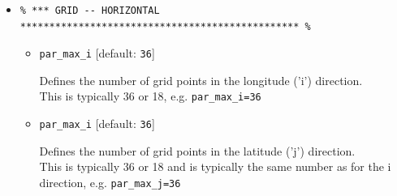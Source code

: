 \begin{itemize}
\begin{itemize}[noitemsep]
Specifies the sub-directory where the \textbf{cookie} configuration files will be saved to.\footnote{This need not be changed.}

\vspace{1mm}
\item \texttt{par\_plotformat}

Specifies the format of the plots that are created by \textsf{\footnotesize makecookie}. If you need better quality figures saved, set this parameter to \texttt{pdf}. \footnote{Note that \textsf{\footnotesize makecookie} will take much longer to run when saving vector graphics.} 

\vspace{1mm}
\item \textcolor{blue}{\texttt{opt\_user}}

\textcolor{blue}{Selects whether or not you wish to have the chance to manually edit the land-sea mask and the seafloor topography. Valid options are \texttt{true} and \texttt{false}. (Even if this option is selected, you need not do any editing.)}

\end{itemize}

\vspace{2mm}
\item []
\small\vspace{-2pt}\begin{verbatim}
% *** GRID -- HORIZONTAL ************************************************ %
\end{verbatim}\vspace{-2pt}\normalsize

\begin{itemize}[noitemsep]

\vspace{1mm}
\item \texttt{par\_max\_i} [default: \texttt{36}]

Defines the number of grid points in the longitude ('i') direction.
\\This is typically 36 or 18, e.g. \texttt{par\_max\_i=36}

\vspace{1mm}
\item \texttt{par\_max\_i} [default: \texttt{36}]

Defines the number of grid points in the latitude ('j') direction.
\\This is typically 36 or 18 and is typically the same number as for the i direction, e.g. \texttt{par\_max\_j=36}


\end{itemize}
\end{itemize}
